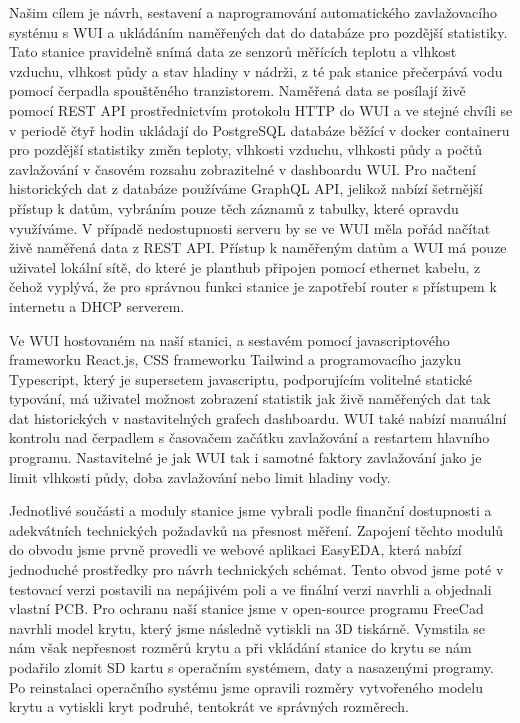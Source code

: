 \documentclass[11pt,a4paper]{article}
\begin{document}
Našim cílem je návrh, sestavení a naprogramování automatického zavlažovacího
systému s WUI a ukládáním naměřených dat do databáze
pro pozdější statistiky. Tato stanice pravidelně snímá data ze senzorů měřících
teplotu a vlhkost vzduchu, vlhkost půdy a stav hladiny v nádrži, z té pak
stanice přečerpává vodu pomocí čerpadla spouštěného tranzistorem. Naměřená data
se posílají živě pomocí REST API prostřednictvím
protokolu HTTP do WUI a ve stejné
chvíli se v periodě čtyř hodin ukládají do PostgreSQL databáze běžící v docker
containeru pro pozdější
statistiky
změn teploty, vlhkosti vzduchu, vlhkosti půdy a počtů zavlažování v časovém
rozsahu zobrazitelné v dashboardu WUI. Pro načtení historických dat z databáze
používáme GraphQL API, jelikož nabízí šetrnější přístup k datům, vybráním pouze
těch záznamů z tabulky, které opravdu využíváme. V případě nedostupnosti
serveru by se ve WUI měla pořád načítat živě naměřená data z REST API. Přístup
k naměřeným datům a
WUI má pouze
uživatel lokální
sítě, do které je planthub připojen pomocí ethernet kabelu, z čehož vyplývá, že
pro správnou funkci
stanice je zapotřebí router s přístupem k internetu a DHCP serverem.

Ve WUI hostovaném na naší stanici, a sestavém pomocí javascriptového frameworku
React.js, CSS frameworku
Tailwind a programovacího jazyku Typescript, který je supersetem javascriptu,
podporujícím volitelné statické typování, má uživatel
možnost zobrazení statistik jak živě naměřených dat tak dat historických v
nastavitelných grafech dashboardu. WUI také nabízí manuální kontrolu nad
čerpadlem s časovačem začátku zavlažování a restartem hlavního programu.
Nastavitelné je jak WUI tak i samotné faktory zavlažování jako je limit
vlhkosti
půdy, doba zavlažování nebo limit hladiny vody.

Jednotlivé součásti a moduly stanice jsme vybrali podle finanční dostupnosti a
adekvátních technických
požadavků na přesnost měření.
Zapojení těchto modulů do obvodu jsme prvně provedli ve webové aplikaci
EasyEDA, která nabízí jednoduché prostředky pro návrh technických
schémat. Tento obvod jsme poté v testovací verzi postavili na nepájivém
poli a ve finální verzi navrhli a objednali vlastní PCB. Pro ochranu naší
stanice jsme v open-source programu FreeCad navrhli model krytu, který jsme
následně vytiskli na 3D tiskárně. Vymstila se nám však nepřesnost rozměrů krytu
a při vkládání stanice do krytu se nám podařilo zlomit SD kartu s operačním
systémem, daty a nasazenými programy. Po reinstalaci operačního systému jsme
opravili rozměry vytvořeného modelu krytu a
vytiskli kryt podruhé, tentokrát ve správných rozměrech.
\end{document}
